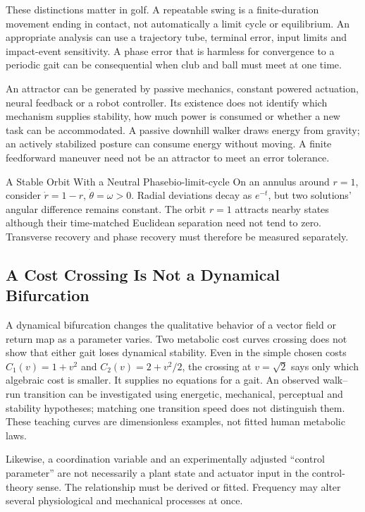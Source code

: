 These distinctions matter in golf. A repeatable swing is a finite-duration
movement ending in contact, not automatically a limit cycle or equilibrium.
An appropriate analysis can use a trajectory tube, terminal error, input limits
and impact-event sensitivity. A phase error that is harmless for convergence to
a periodic gait can be consequential when club and ball must meet at one time.

An attractor can be generated by passive mechanics, constant powered actuation,
neural feedback or a robot controller. Its existence does not identify which
mechanism supplies stability, how much power is consumed or whether a new task
can be accommodated. A passive downhill walker draws energy from gravity;
an actively stabilized posture can consume energy without moving. A finite
feedforward maneuver need not be an attractor to meet an error tolerance.

\begin{example}[colframe=chapblue]{A Stable Orbit With a Neutral Phase}{bio-limit-cycle}
On an annulus around $r=1$, consider $\dot r=1-r$, $\dot\theta=\omega>0$.
Radial deviations decay as $e^{-t}$, but two solutions' angular difference
remains constant. The orbit $r=1$ attracts nearby states although their
time-matched Euclidean separation need not tend to zero. Transverse recovery
and phase recovery must therefore be measured separately.
\end{example}

\subsection{A Cost Crossing Is Not a Dynamical Bifurcation}

A dynamical bifurcation changes the qualitative behavior of a vector field or
return map as a parameter varies. Two metabolic cost curves crossing does not
show that either gait loses dynamical stability. Even in the simple chosen
costs $C_1(v)=1+v^2$ and $C_2(v)=2+v^2/2$, the crossing at $v=\sqrt2$
says only which algebraic cost is smaller. It supplies no equations for a gait.
An observed walk--run transition can be investigated using energetic, mechanical,
perceptual and stability hypotheses; matching one transition speed does not
distinguish them. These teaching curves are dimensionless examples, not fitted
human metabolic laws.

Likewise, a coordination variable and an experimentally adjusted ``control
parameter'' are not necessarily a plant state and actuator input in the
control-theory sense. The relationship must be derived or fitted. Frequency
may alter several physiological and mechanical processes at once.

